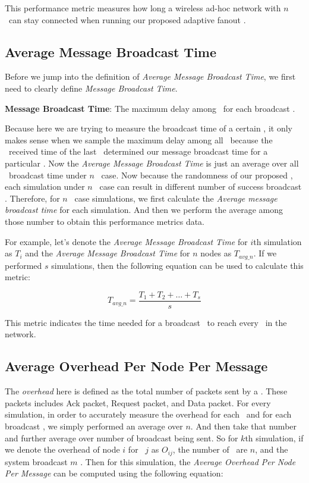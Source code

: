 This performance metric measures how long a wireless ad-hoc network with $n$ \gns ~can stay connected when running our proposed adaptive fanout \gp.

\subsection{Average Message Broadcast Time}

Before we jump into the definition of \emph{Average Message Broadcast Time}, we first need to clearly define \emph{Message Broadcast Time}.

\textbf{Message Broadcast Time}: The maximum delay among \gns ~for each broadcast \msg.

Because here we are trying to measure the broadcast time of a certain \msg, it only makes sense when we sample the maximum delay among all \gns ~because the \msg ~received time of the last \gn ~determined our message broadcast time for a particular \msg. Now the \emph{Average Message Broadcast Time} is just an average over all \msg ~broadcast time under $n$ \gn ~case. Now because the randomness of our proposed \gp, each simulation under $n$ \gn ~case can result in different number of success broadcast \msgs. Therefore, for $n$ \gn ~case simulations, we first calculate the \emph{Average message broadcast time} for each simulation. And then we perform the average among those number to obtain this performance metrics data.

For example, let's denote the \emph{Average Message Broadcast Time} for $i$th simulation as $T_i$ and the \emph{Average Message Broadcast Time} for $n$ nodes as $T_{avg\_n}$. If we performed $s$ simulations, then the following equation can be used to calculate this metric:

\[ T_{avg\_n} = \frac{T_1 + T_2 + \ldots + T_s}{s} \]

This metric indicates the time needed for a broadcast \msg ~to reach every \gn ~in the network.

\subsection{Average Overhead Per Node Per Message}

The \emph{overhead} here is defined as the total number of packets sent by a \gn. These packets includes Ack packet, Request packet, and Data packet. For every simulation, in order to accurately measure the overhead for each \gn ~and for each broadcast \msg, we simply performed an average over $n$. And then take that number and further average over number of broadcast \msgs being sent. So for $k$th simulation, if we denote the overhead of node $i$ for \msg ~$j$ as $O_{ij}$, the number of \gns ~are $n$, and the system broadcast $m$ \msgs. Then for this simulation, the \emph{Average Overhead Per Node Per Message} can be computed using the following equation:

